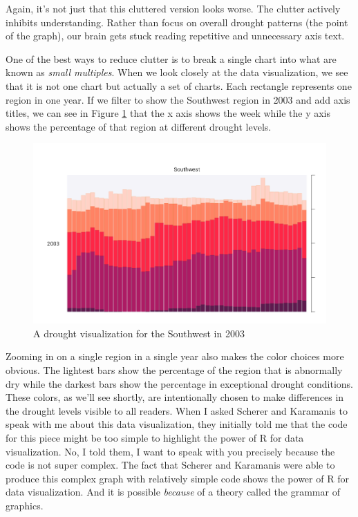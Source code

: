 \documentclass[
]{book}
\begin{document}
Again, it's not just that this cluttered version looks worse. The clutter actively inhibits understanding. Rather than focus on overall drought patterns (the point of the graph), our brain gets stuck reading repetitive and unnecessary axis text.

One of the best ways to reduce clutter is to break a single chart into what are known as \emph{small multiples}. When we look closely at the data visualization, we see that it is not one chart but actually a set of charts. Each rectangle represents one region in one year. If we filter to show the Southwest region in 2003 and add axis titles, we can see in Figure \ref{fig:viz-sw-2003} that the x axis shows the week while the y axis shows the percentage of that region at different drought levels.

\begin{figure}
\includegraphics[width=1\linewidth]{data-viz_files/figure-latex/viz-sw-2003-1} \caption{A drought visualization for the Southwest in 2003}\label{fig:viz-sw-2003}
\end{figure}

Zooming in on a single region in a single year also makes the color choices more obvious. The lightest bars show the percentage of the region that is abnormally dry while the darkest bars show the percentage in exceptional drought conditions. These colors, as we'll see shortly, are intentionally chosen to make differences in the drought levels visible to all readers.
When I asked Scherer and Karamanis to speak with me about this data visualization, they initially told me that the code for this piece might be too simple to highlight the power of R for data visualization. No, I told them, I want to speak with you precisely because the code is not super complex. The fact that Scherer and Karamanis were able to produce this complex graph with relatively simple code shows the power of R for data visualization. And it is possible \emph{because} of a theory called the grammar of graphics.
\end{document}
